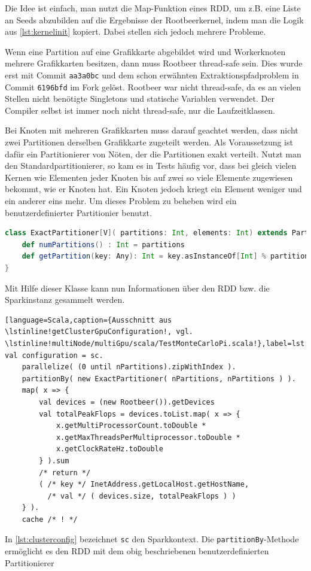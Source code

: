 Die Idee ist einfach, man nutzt die Map-Funktion eines RDD, um z.B. eine Liste an Seeds abzubilden auf die Ergebnisse der Rootbeerkernel, indem man die Logik aus \autoref{lst:kernelinit} kopiert.
Dabei stellen sich jedoch mehrere Probleme.

Wenn eine Partition auf eine Grafikkarte abgebildet wird und Workerknoten mehrere Grafikkarten besitzen, dann muss Rootbeer thread-safe sein. Dies wurde erst mit Commit \lstinline!aa3a0bc! und dem schon erwähnten Extraktionspfadproblem in Commit \lstinline!6196bfd! im Fork \cite{ownrootbeerfork} gelöst. Rootbeer war nicht thread-safe, da es an vielen Stellen nicht benötigte Singletons und statische Variablen verwendet. Der Compiler selbst ist immer noch nicht thread-safe, nur die Laufzeitklassen.

Bei Knoten mit mehreren Grafikkarten muss darauf geachtet werden, dass nicht zwei Partitionen derselben Grafikkarte zugeteilt werden.
Als Voraussetzung ist dafür ein Partitionierer von Nöten, der die Partitionen exakt verteilt.
Nutzt man den Standardpartitionierer, so kam es in Tests häufig vor, dass bei gleich vielen Kernen wie Elementen jeder Knoten bis auf zwei so viele Elemente zugewiesen bekommt, wie er Knoten hat. Ein Knoten jedoch kriegt ein Element weniger und ein anderer eins mehr. Um dieses Problem zu beheben wird ein benutzerdefinierter Partitionier benutzt.
\begin{lstlisting}[language=Scala,caption={Exakter Partitionierer},label={lst:exactpart}]
class ExactPartitioner[V]( partitions: Int, elements: Int) extends Partitioner {
    def numPartitions() : Int = partitions
    def getPartition(key: Any): Int = key.asInstanceOf[Int] % partitions
}
\end{lstlisting}
Mit Hilfe dieser Klasse kann nun Informationen über den RDD bzw. die Sparkinstanz gesammelt werden.
\begin{lstlisting}[language=Scala,caption={Ausschnitt aus \lstinline!getClusterGpuConfiguration!, vgl. \lstinline!multiNode/multiGpu/scala/TestMonteCarloPi.scala!},label=lst:clusterconfig}
val configuration = sc.
    parallelize( (0 until nPartitions).zipWithIndex ).
    partitionBy( new ExactPartitioner( nPartitions, nPartitions ) ).
    map( x => {
        val devices = (new Rootbeer()).getDevices
        val totalPeakFlops = devices.toList.map( x => {
            x.getMultiProcessorCount.toDouble *
            x.getMaxThreadsPerMultiprocessor.toDouble *
            x.getClockRateHz.toDouble
        } ).sum
        /* return */
        ( /* key */ InetAddress.getLocalHost.getHostName,
          /* val */ ( devices.size, totalPeakFlops ) )
    } ).
    cache /* ! */
\end{lstlisting}
In \autoref{lst:clusterconfig} bezeichnet \lstinline!sc! den Sparkkontext. Die \lstinline!partitionBy!-Methode ermöglicht es den RDD mit dem obig beschriebenen benutzerdefinierten Partitionierer


